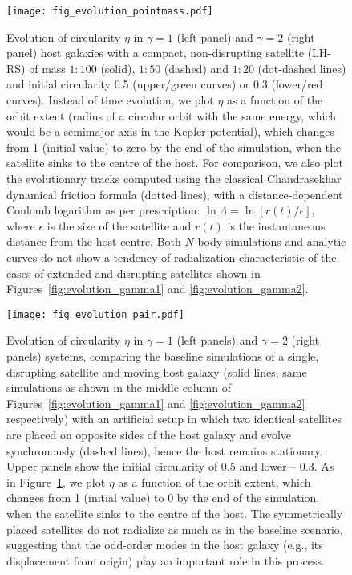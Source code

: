 \documentclass[twocolumn]{aastex63}
\newcommand{\LH}{\textsf{L\!H}\xspace}
\newcommand{\RS}{\textsf{R\!S}\xspace}
\begin{document}
\begin{figure}
\texttt{[image: fig\_evolution\_pointmass.pdf]}
\caption{Evolution of circularity $\eta$ in $\gamma=1$ (left panel) and $\gamma=2$ (right panel) host galaxies with a compact, non-disrupting satellite (\LH-\RS) of mass $1:100$ (solid), $1:50$ (dashed) and $1:20$ (dot-dashed lines) and initial circularity 0.5 (upper/green curves) or 0.3 (lower/red curves). Instead of time evolution, we plot $\eta$ as a function of the orbit extent (radius of a circular orbit with the same energy, which would be a semimajor axis in the Kepler potential), which changes from 1 (initial value) to zero by the end of the simulation, when the satellite sinks to the centre of the host. For comparison, we also plot the evolutionary tracks computed using the classical Chandrasekhar dynamical friction formula (dotted lines), with a distance-dependent Coulomb logarithm as per \citet{Hashimoto2003} prescription: $\ln\Lambda = \ln [r(t)/\epsilon]$, where $\epsilon$ is the size of the satellite and $r(t)$ is the instantaneous distance from the host centre. Both $N$-body simulations and analytic curves do not show a tendency of radialization characteristic of the cases of extended and disrupting satellites shown in Figures~\ref{fig:evolution_gamma1} and \ref{fig:evolution_gamma2}.
}  \label{fig:evolution_pointmass}
\end{figure}

\begin{figure}
\texttt{[image: fig\_evolution\_pair.pdf]}
\caption{Evolution of circularity $\eta$ in $\gamma=1$ (left panels) and $\gamma=2$ (right panels) systems, comparing the baseline simulations of a single, disrupting satellite and moving host galaxy (solid lines, same simulations as shown in the middle column of Figures~\ref{fig:evolution_gamma1} and \ref{fig:evolution_gamma2} respectively) with an artificial setup in which two identical satellites are placed on opposite sides of the host galaxy and evolve synchronously (dashed lines), hence the host remains stationary. Upper panels show the initial circularity of 0.5 and lower -- 0.3. As in Figure~\ref{fig:evolution_pointmass}, we plot $\eta$ as a function of the orbit extent, which changes from 1 (initial value) to 0 by the end of the simulation, when the satellite sinks to the centre of the host. The symmetrically placed satellites do not radialize as much as in the baseline scenario, suggesting that the odd-order modes in the host galaxy (e.g., its displacement from origin) play an important role in this process.
}  \label{fig:evolution_pair}
\end{figure}
\end{document}
